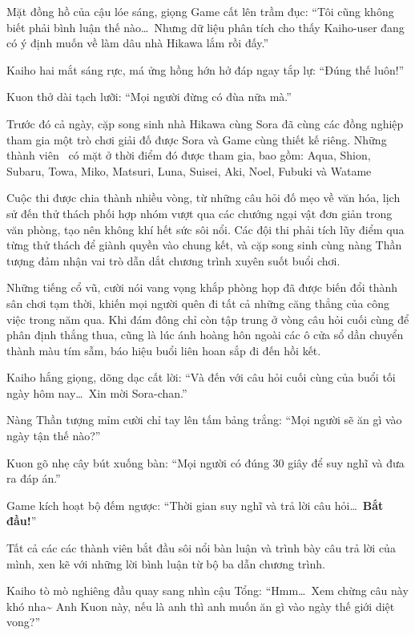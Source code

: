 \documentclass[../main.tex]{subfiles}
\begin{document}
Mặt đồng hồ của cậu lóe sáng, giọng Game cất lên trầm đục: ``Tôi cũng không biết phải bình luận thế nào\dots\ Nhưng dữ liệu phân tích cho thấy Kaiho-user đang có ý định muốn về làm dâu nhà Hikawa lắm rồi đấy.''

Kaiho hai mắt sáng rực, má ửng hồng hớn hở đáp ngay tắp lự: ``Đúng thế luôn!''

Kuon thở dài tạch lưỡi: ``Mọi người đừng có đùa nữa mà.''

Trước đó cả ngày, cặp song sinh nhà Hikawa cùng Sora đã cùng các đồng nghiệp tham gia một trò chơi giải đố được Sora và Game cùng thiết kế riêng. Những thành viên \hll\ có mặt ở thời điểm đó được tham gia, bao gồm: Aqua, Shion, Subaru, Towa, Miko, Matsuri, Luna, Suisei, Aki, Noel, Fubuki và Watame


Cuộc thi được chia thành nhiều vòng, từ những câu hỏi đố mẹo về văn hóa, lịch sử đến thử thách phối hợp nhóm vượt qua các chướng ngại vật đơn giản trong văn phòng, tạo nên không khí hết sức sôi nổi. Các đội thi phải tích lũy điểm qua từng thử thách để giành quyền vào chung kết, và cặp song sinh cùng nàng Thần tượng đảm nhận vai trò dẫn dắt chương trình xuyên suốt buổi chơi.

Những tiếng cổ vũ, cười nói vang vọng khắp phòng họp đã được biến đổi thành sân chơi tạm thời, khiến mọi người quên đi tất cả những căng thẳng của công việc trong năm qua. Khi đám đông chỉ còn tập trung ở vòng câu hỏi cuối cùng để phân định thắng thua, cũng là lúc ánh hoàng hôn ngoài các ô cửa sổ dần chuyển thành màu tím sẫm, báo hiệu buổi liên hoan sắp đi đến hồi kết.

Kaiho hắng giọng, dõng dạc cất lời: ``Và đến với câu hỏi cuối cùng của buổi tối ngày hôm nay\dots\ Xin mời Sora-chan.''

Nàng Thần tượng mỉm cười chỉ tay lên tấm bảng trắng: ``Mọi người sẽ ăn gì vào ngày tận thế nào?''


Kuon gõ nhẹ cây bút xuống bàn: ``Mọi người có đúng 30 giây để suy nghĩ và đưa ra đáp án.''

Game kích hoạt bộ đếm ngược: ``Thời gian suy nghĩ và trả lời câu hỏi\dots\ \textbf{Bắt đầu!}''

Tất cả các các thành viên bắt đầu sôi nổi bàn luận và trình bày câu trả lời của mình, xen kẽ với những lời bình luận từ bộ ba dẫn chương trình.

Kaiho tò mò nghiêng đầu quay sang nhìn cậu Tổng: ``Hmm\dots\ Xem chừng câu này khó nha\~{} Anh Kuon này, nếu là anh thì anh muốn ăn gì vào ngày thế giới diệt vong?''
\end{document}

